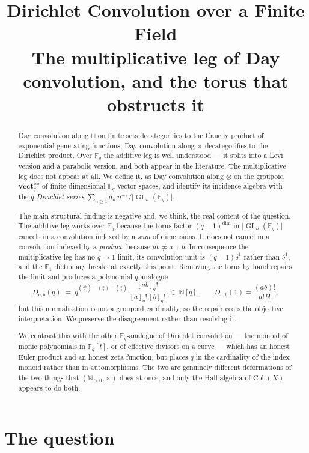 \documentclass[11pt,a4paper]{article}
\title{\bfseries Dirichlet Convolution over a Finite Field\\[0.4em]
\large The multiplicative leg of Day convolution, and the torus that obstructs it}
\author{}
\date{}
\theoremstyle{definition}
\theoremstyle{remark}
\newcommand{\FF}{\mathbb{F}}
\newcommand{\NN}{\mathbb{N}}
\newcommand{\cat}[1]{\mathbf{#1}}
\newcommand{\vect}{\cat{vect}}
\DeclareMathOperator{\GL}{GL}
\newcommand{\norm}[1]{\lvert #1 \rvert}
\newcommand{\iso}{\mathrm{iso}}
\begin{document}
\maketitle

\begin{abstract}
Day convolution along $\sqcup$ on finite sets decategorifies to the Cauchy product of
exponential generating functions; Day convolution along $\times$ decategorifies to the
Dirichlet product. Over $\FF_q$ the additive leg is well understood --- it splits into a
Levi version and a parabolic version, and both appear in the literature. The
multiplicative leg does not appear at all. We define it, as Day convolution along
$\otimes$ on the groupoid $\vect_q^{\iso}$ of finite-dimensional $\FF_q$-vector spaces,
and identify its incidence algebra with the \emph{$q$-Dirichlet series}
$\sum_{n\ge1} a_n\, n^{-s}/\norm{\GL_n(\FF_q)}$.

The main structural finding is negative and, we think, the real content of the question.
The additive leg works over $\FF_q$ because the torus factor $(q-1)^{\dim}$ in
$\norm{\GL_n(\FF_q)}$ cancels in a convolution indexed by a \emph{sum} of dimensions. It
does not cancel in a convolution indexed by a \emph{product}, because $ab \neq a+b$. In
consequence the multiplicative leg has no $q \to 1$ limit, its convolution unit is
$(q-1)\delta^1$ rather than $\delta^1$, and the $\FF_1$ dictionary breaks at exactly this
point. Removing the torus by hand repairs the limit and produces a polynomial
$q$-analogue
\[
  D_{a,b}(q) \;=\; q^{\binom{ab}{2}-\binom{a}{2}-\binom{b}{2}}\,
  \frac{[ab]_q!}{[a]_q!\,[b]_q!}
  \;\in\; \NN[q],
  \qquad D_{a,b}(1) = \frac{(ab)!}{a!\,b!},
\]
but this normalisation is not a groupoid cardinality, so the repair costs the objective
interpretation. We preserve the disagreement rather than resolving it.

We contrast this with the other $\FF_q$-analogue of Dirichlet convolution --- the monoid
of monic polynomials in $\FF_q[t]$, or of effective divisors on a curve --- which has an
honest Euler product and an honest zeta function, but places $q$ in the cardinality of
the index monoid rather than in automorphisms. The two are genuinely different
deformations of the two things that $(\NN_{>0},\times)$ does at once, and only the Hall
algebra of $\mathrm{Coh}(X)$ appears to do both.
\end{abstract}

\tableofcontents

\section{The question}
\end{document}
